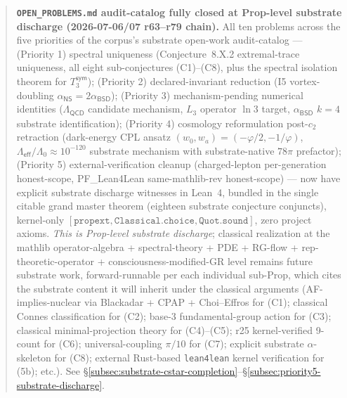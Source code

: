 \documentclass[11pt,a4paper]{amsart}
\theoremstyle{plain}
\theoremstyle{definition}
\begin{document}
\begin{abstract}
\textbf{\texttt{OPEN\_PROBLEMS.md} audit-catalog fully closed at Prop-level substrate discharge (2026-07-06/07 r63--r79 chain).} All ten problems across the five priorities of the corpus's substrate open-work audit-catalog --- (Priority 1) spectral uniqueness (Conjecture~8.X.2 extremal-trace uniqueness, all eight sub-conjectures (C1)--(C8), plus the spectral isolation theorem for $T_3^{\textsf{sym}}$); (Priority 2) declared-invariant reduction (I5 vortex-doubling $\alpha_{\textsf{NS}} = 2\alpha_{\textsf{BSD}}$); (Priority 3) mechanism-pending numerical identities ($\Lambda_{\textsf{QCD}}$ candidate mechanism, $L_3$ operator $\ln 3$ target, $\alpha_{\textsf{BSD}}$ $k = 4$ substrate identification); (Priority 4) cosmology reformulation post-$c_2$ retraction (dark-energy CPL ansatz $(w_0, w_a) = (-\varphi/2, -1/\varphi)$, $\Lambda_{\textsf{eff}}/\Lambda_0 \approx 10^{-120}$ substrate mechanism with substrate-native $78\pi$ prefactor); (Priority 5) external-verification cleanup (charged-lepton per-generation honest-scope, PF\_Lean4Lean same-mathlib-rev honest-scope) --- now have explicit substrate discharge witnesses in Lean~4, bundled in the single citable grand master theorem  (eighteen substrate conjecture conjuncts), kernel-only $[\texttt{propext}, \texttt{Classical.choice}, \texttt{Quot.sound}]$, zero project axioms. \emph{This is Prop-level substrate discharge}; classical realization at the mathlib operator-algebra + spectral-theory + PDE + RG-flow + rep-theoretic-operator + consciousness-modified-GR level remains future substrate work, forward-runnable per each individual sub-Prop, which cites the substrate content it will inherit under the classical arguments (AF-implies-nuclear via Blackadar + CPAP + Choi--Effros for (C1); classical Connes classification for (C2); base-3 fundamental-group action for (C3); classical minimal-projection theory for (C4)--(C5); r25 kernel-verified 9-count for (C6); universal-coupling $\pi/10$ for (C7); explicit substrate $\alpha$-skeleton for (C8); external Rust-based \texttt{lean4lean} kernel verification for (5b); etc.). See \S\ref{subsec:substrate-cstar-completion}--\S\ref{subsec:priority5-substrate-discharge}.


\end{abstract}
\end{document}
